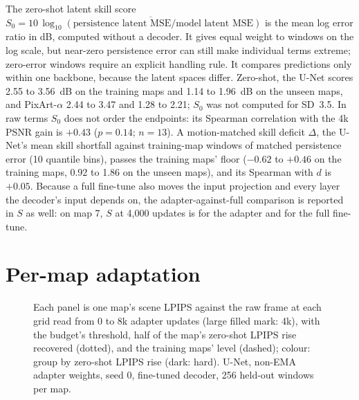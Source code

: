 The zero-shot latent skill score $S_0=10\,\overline{\log_{10}(\text{persistence latent MSE}/\text{model latent MSE})}$ is the mean log error ratio in dB, computed without a decoder. It gives equal weight to windows on the log scale, but near-zero persistence error can still make individual terms extreme; zero-error windows require an explicit handling rule. It compares predictions only within one backbone, because the latent spaces differ. Zero-shot, the U-Net scores 2.55 to 3.56~dB on the training maps and 1.14 to 1.96~dB on the unseen maps, and PixArt-$\alpha$ 2.44 to 3.47 and 1.28 to 2.21; $S_0$ was not computed for SD~3.5. In raw terms $S_0$ does not order the endpoints: its Spearman correlation with the 4k PSNR gain is $+0.43$ ($p=0.14$; $n=13$). A motion-matched skill deficit $\Delta$, the U-Net's mean skill shortfall against training-map windows of matched persistence error (10 quantile bins), passes the training maps' floor ($-0.62$ to $+0.46$ on the training maps, 0.92 to 1.86 on the unseen maps), and its Spearman with $d$ is $+0.05$. Because a full fine-tune also moves the input projection and every layer the decoder's input depends on, the adapter-against-full comparison is reported in $S$ as well: on map 7, $S$ at 4,000 updates is \tbd{} for the adapter and \tbd{} for the full fine-tune.

\section{Per-map adaptation}
\label{app:perarena-adapt}

\begin{table}[ht]
\centering\scriptsize\setlength{\tabcolsep}{2.5pt}
\caption{Per unseen map, in map order: the zero-shot LPIPS rise over the training maps, the budget (the first grid read at which the map recovers half of that rise; ${>}$8k: censored), scene PSNR and LPIPS against the raw frame at 0, 4k and 8k updates, and the recovered shares at 4k (of the zero-shot LPIPS rise over the in-distribution level undone and of the lost scene PSNR regained). $^\dagger$Control checks at the 8k check, stock decoder: the change in the training maps' scene PSNR against the decoded ground truth, where persistence cancels (negative is loss), and the directional score.}
\label{tab:perarena-adapt}

\end{table}

\begin{figure}[ht]
\centering
{}
\caption{Each panel is one map's scene LPIPS against the raw frame at each grid read from 0 to 8k adapter updates (large filled mark: 4k), with the budget's threshold, half of the map's zero-shot LPIPS rise recovered (dotted), and the training maps' level (dashed); colour: group by zero-shot LPIPS rise (dark: hard). U-Net, non-EMA adapter weights, seed 0, fine-tuned decoder, 256 held-out windows per map.}
\label{fig:adapt-arenas}
\end{figure}


